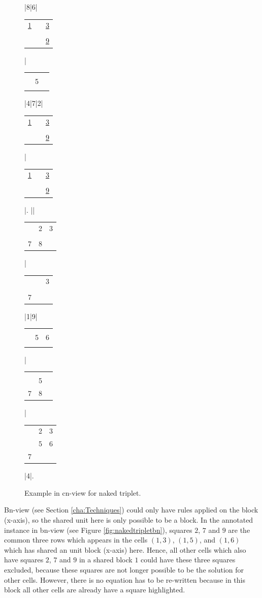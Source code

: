 \documentclass[11pt]{report}
\newcommand{\cell}[9]{%
\scriptsize
\setlength{\tabcolsep}{1pt}
\renewcommand{\arraystretch}{0.5}
\hspace{-0.6em}
\begin{tabular}{ccc}
#1 & #2 & #3\\
#4 & #5 & #6\\
#7 & #8 & #9
\end{tabular}
}
\begin{document}
\begin{figure}[htbp]
\begin{sudoku}
|{8}|6|{\cell {\underline 1}{}{\underline 3}{}{}{}{}{}{\underline 9}}|{\cell {}{}{}{}5{}{}{}{}}|4|7|2|{\cell {\underline 1}{}{\underline 3}{}{}{}{}{}{\underline 9}}|{\cell {\underline 1}{}{\underline 3}{}{}{}{}{}{\underline 9}}|.
|{\makebox[0pt]{\hspace{-2.1em}\large c9}{\cell {}23{}56{}{}{}}}|{\cell {}23{}{}{}78{}}|{\cell {}{}3{}{}{}7{}{}}|1|9|{\cell {}{}{}{}56{}{}{}}|{\cell {}{}{}{}5{}78{}}|{\cell {}23{}567{}{}}|4|.
\end{sudoku}
\caption{Example in cn-view for naked triplet.}
\label{fig:nakedtripletcn}
\end{figure}

Bn-view (see Section \ref{cha:Techniques}) could only have rules applied on the block (x-axis), so the shared unit here is only possible to be a block. In the annotated instance in bn-view (see Figure \ref{fig:nakedtripletbn}), squares $2$, $7$ and $9$ are the common three rows which appears in the cells $(1,3)$, $(1,5)$, and $(1,6)$ which has shared an unit block (x-axis) here. Hence, all other cells which also have squares $2$, $7$ and $9$ in a shared block $1$ could have these three squares excluded, because these squares are not longer possible to be the solution for other cells. However, there is no equation has to be re-written because in this block all other cells are already have a square highlighted.
\end{document}
